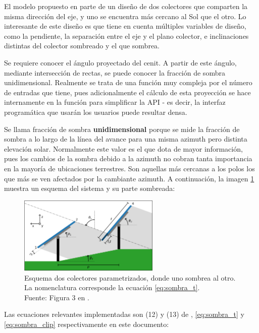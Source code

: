 El modelo propuesto en \cite{Anderson_Jensen_2024} parte de un diseño de dos colectores que comparten la misma dirección del eje, y uno se encuentra más cercano al Sol que el otro. Lo interesante de este diseño es que tiene en cuenta múltiples variables de diseño, como la pendiente, la separación entre el eje y el plano colector, e inclinaciones distintas del colector sombreado y el que sombrea.

Se requiere conocer el ángulo proyectado del cenit. A partir de este ángulo, mediante intersección de rectas, se puede conocer la fracción de sombra unidimensional. Realmente se trata de una función muy compleja por el número de entradas que tiene, pues adicionalmente el cálculo de esta proyección se hace internamente en la función para simplificar la API - es decir, la interfaz programática que usarán los usuarios puede resultar densa.

Se llama fracción de sombra \textbf{unidimensional} porque se mide la fracción de sombra a lo largo de la línea del avance para una misma azimuth pero distinta elevación solar. Normalmente este valor es el que dota de mayor información, pues los cambios de la sombra debido a la azimuth no cobran tanta importancia en la mayoría de ubicaciones terrestres. Son aquellas más cercanas a los polos los que más se ven afectados por la cambiante azimuth. A continuación, la imagen \ref{fig:fraccion_sombra} muestra un esquema del sistema y su parte sombreada:

\begin{figure}[H]
    \centering
    \includegraphics[width=0.6\textwidth]{./images/shading_1d/Anderson_Jensen_Fig3.png}
    \caption{Esquema dos colectores parametrizados, donde uno sombrea al otro. La nomenclatura corresponde la ecuación \ref{eq:sombra_t}.\\Fuente: Figura 3 en \cite{Anderson_Jensen_2024}.}
    \label{fig:fraccion_sombra}
\end{figure}

Las ecuaciones relevantes implementadas son (12) y (13) de \cite{Anderson_Jensen_2024}, \ref{eq:sombra_t} y \ref{eq:sombra_clip} respectivamente en este documento:


